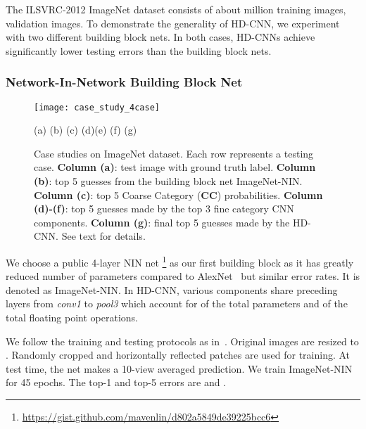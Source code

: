 \documentclass[10pt,twocolumn,letterpaper]{article}
\begin{document}
The ILSVRC-2012 ImageNet dataset consists of about  million training images,  validation images. To demonstrate the generality of HD-CNN, we experiment with two different building block nets. In both cases, HD-CNNs achieve significantly lower testing errors than the building block nets.

\subsubsection{Network-In-Network Building Block Net}

\begin{figure*}[ht]
\begin{center}
\texttt{[image: case\_study\_4case]}
 \centerline{(a) \hfill (b) \hfill (c) \hfill (d)\hfill (e) \hfill (f) \hfill (g)}
\end{center}
\vspace{-1em}
   \caption{Case studies on ImageNet dataset. Each row represents a testing case. \textbf{Column (a)}: test image with ground truth label. \textbf{Column (b)}: top 5 guesses from the building block net ImageNet-NIN.  \textbf{Column (c)}: top 5 Coarse Category (\textbf{CC}) probabilities. \textbf{Column (d)-(f)}: top 5 guesses made by the top 3 fine category CNN components. \textbf{Column (g)}: final top 5 guesses made by the HD-CNN.  See text for details.
}
\vspace{-2.5em}
\label{fig:case study}
\end{figure*}

We choose a public 4-layer NIN net \footnote{\url{https://gist.github.com/mavenlin/d802a5849de39225bcc6}} as our first building block as it has greatly reduced number of parameters compared to AlexNet~\cite{krizhevsky2012imagenet} but similar error rates. It is denoted as ImageNet-NIN. In HD-CNN, various components share preceding layers from \textit{conv1} to \textit{pool3} which account for  of the total parameters and  of the total floating point operations.


We follow the training and testing protocols as in~\cite{krizhevsky2012imagenet}. Original images are resized to . Randomly cropped and horizontally reflected  patches are used for training. At test time, the net makes a 10-view averaged prediction.  We train ImageNet-NIN for 45 epochs. The top-1 and top-5 errors are  and .
\end{document}
